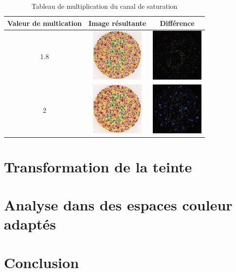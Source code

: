 \documentclass[a4paper,11pt]{article}
\begin{document}
\begin{table}[H]
  \begin{center}
  
    \begin{tabular}{|c|c|c|}
    
      \hline
    
      \bf Valeur de multication &
      \bf Image résultante &
      \bf Différence \\
      
      \hline
      \hline
      
      1.8 & 
      \includegraphics[width=100px]{images/it3_result_1-8.png} &
      \includegraphics[width=100px]{images/it3_diff_1-8.png}  \\
      
      \hline
      
      2 &
      \includegraphics[width=100px]{images/it3_result_2.png} &
      \includegraphics[width=100px]{images/it3_diff_2.png}  \\
      
      \hline
    \end{tabular}
    
    \caption{Tableau de multiplication du canal de saturation}
    \label{tab:}
    
  \end{center}
\end{table}

\section{Transformation de la teinte}

\section{Analyse dans des espaces couleur adaptés}

\section*{Conclusion}
\end{document}
